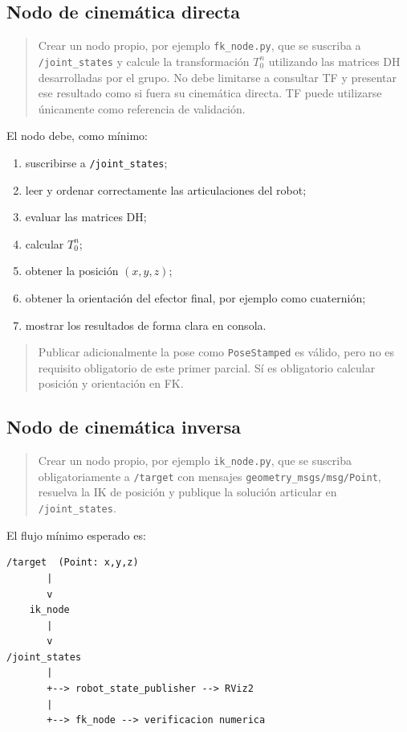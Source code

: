 \documentclass[journal]{IEEEtran}
\newcommand{\instr}[1]{%
\begin{quote}
\small
\noindent\textbf{\color{blue}{INSTRUCCIÓN:}} #1
\end{quote}
}
\begin{document}
\subsection{Nodo de cinemática directa}

\instr{Crear un nodo propio, por ejemplo \texttt{fk\_node.py}, que se suscriba a \texttt{/joint\_states} y calcule la transformación $T_0^n$ utilizando las matrices DH desarrolladas por el grupo. No debe limitarse a consultar TF y presentar ese resultado como si fuera su cinemática directa. TF puede utilizarse únicamente como referencia de validación.}

El nodo debe, como mínimo:

\begin{enumerate}
    \item suscribirse a \texttt{/joint\_states};
    \item leer y ordenar correctamente las articulaciones del robot;
    \item evaluar las matrices DH;
    \item calcular $T_0^n$;
    \item obtener la posición $(x,y,z)$;
    \item obtener la orientación del efector final, por ejemplo como cuaternión;
    \item mostrar los resultados de forma clara en consola.
\end{enumerate}

\instr{Publicar adicionalmente la pose como \texttt{PoseStamped} es válido, pero no es requisito obligatorio de este primer parcial. Sí es obligatorio calcular posición y orientación en FK.}

\subsection{Nodo de cinemática inversa}

\instr{Crear un nodo propio, por ejemplo \texttt{ik\_node.py}, que se suscriba obligatoriamente a \texttt{/target} con mensajes \texttt{geometry\_msgs/msg/Point}, resuelva la IK de posición y publique la solución articular en \texttt{/joint\_states}.}

El flujo mínimo esperado es:

\begin{verbatim}
/target  (Point: x,y,z)
       |
       v
    ik_node
       |
       v
/joint_states
       |
       +--> robot_state_publisher --> RViz2
       |
       +--> fk_node --> verificacion numerica
\end{verbatim}
\end{document}
